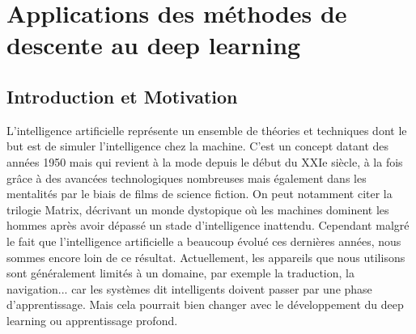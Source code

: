 \chapter{Applications des méthodes de descente au deep learning}
\section{Introduction et Motivation}
L'intelligence artificielle représente un ensemble de théories et techniques dont le but est de simuler l'intelligence chez la machine. C'est un concept datant des années 1950 mais qui revient à la mode depuis le début du XXIe siècle, à la fois grâce à des avancées technologiques nombreuses mais également dans les mentalités par le biais de films de science fiction. On peut notamment citer la trilogie Matrix, décrivant un monde dystopique où les machines dominent les hommes après avoir dépassé un stade d'intelligence inattendu. Cependant malgré le fait que l'intelligence artificielle a beaucoup évolué ces dernières années, nous sommes encore loin de ce résultat. Actuellement, les appareils que nous utilisons sont généralement limités à un domaine, par exemple la traduction, la navigation... car les systèmes dit intelligents doivent passer par une phase d'apprentissage. Mais cela pourrait bien changer avec le développement du deep learning ou apprentissage profond.

